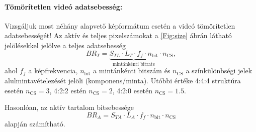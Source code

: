 \paragraph{Tömörítetlen videó adatsebesség:\\}

Vizsgáljuk most néhány alapvető képformátum esetén a videó tömörítetlen adatsebességét!
Az aktív és teljes pixelszámokat a \ref{Fig:size} ábrán látható jelölésekkel jelölve a teljes adatsebesség
\begin{equation}
B\!R_T = \underbrace{S_{TL} \cdot L_T \cdot f_f \cdot n_{\mathrm{bit}}}_{\text{mintánkénti bitrate}} \cdot n_{\mathrm{CS}},
\end{equation}
ahol $f_f$ a képfrekvencia, $n_{\mathrm{bit}}$ a mintánkénti bitszám és $n_{\mathrm{CS}}$ a színkülönbségi jelek alulmintavételezését jelöli (komponens/minta).
Utóbbi értéke 4:4:4 struktúra esetén $n_{\mathrm{CS}} = 3$, 4:2:2 estén $n_{\mathrm{CS}}=2$, 4:2:0 esetén $n_{\mathrm{CS}} = 1.5$.

Hasonlóan, az aktív tartalom bitsebessége
\begin{equation}
B\!R_A = S_{TA} \cdot L_A \cdot f_f \cdot n_{\mathrm{bit}} \cdot n_{\mathrm{CS}}
\end{equation}
alapján számítható.

